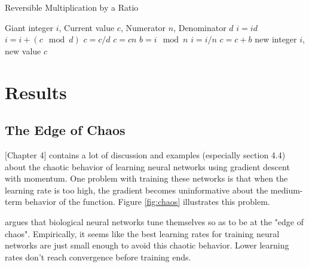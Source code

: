 \documentclass{article}
\begin{document}
\begin{algorithm}
   \caption{Reversible Multiplication by a Ratio}
   \label{alg:reversible-mult}
\begin{algorithmic}
    Giant integer $i$, Current value $c$, Numerator $n$, Denominator $d$
   \STATE $i = id$ 
   \STATE $i = i + (c \mod d)$ 
   \STATE $c = c / d$ 
   \STATE $c = cn$ 
   \STATE $b = i \mod n$ 
   \STATE $i = i / n$ 
   \STATE $c = c + b$ 
   \RETURN new integer $i$, new value $c$
\end{algorithmic}
\end{algorithm}
%


\section{Results}

\subsection{The Edge of Chaos}

\cite{pearlmutter1996investigation}[Chapter 4] contains a lot of discussion and examples (especially section 4.4) about the chaotic behavior of learning neural networks using gradient descent with momentum.
One problem with training these networks is that when the learning rate is too high, the gradient becomes uninformative about the medium-term behavior of the function.
Figure \ref{fig:chaos} illustrates this problem.

\cite{pearlmutter2009sleep} argues that biological neural networks tune themselves so as to be at the "edge of chaos".
Empirically, it seems like the best learning rates for training neural networks are just small enough to avoid this chaotic behavior.
Lower learning rates don't reach convergence before training ends.
\end{document}

